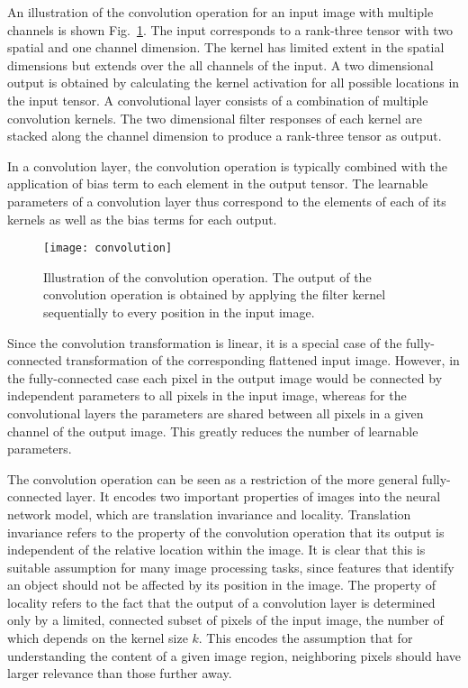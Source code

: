 An illustration of the convolution operation for an input image with multiple
channels is shown Fig.~\ref{fig:machine_learning:convoluation}. The input
corresponds to a rank-three tensor with two spatial and one channel dimension.
The kernel has limited extent in the spatial dimensions but extends over the all
channels of the input. A two dimensional output is obtained by calculating the
kernel activation for all possible locations in the input tensor. A
convolutional layer consists of a combination of multiple convolution kernels.
The two dimensional filter responses of each kernel are stacked along the
channel dimension to produce a rank-three tensor as output.

In a convolution layer, the convolution operation is typically combined with
the application of bias term to each element in the output tensor. The learnable
parameters of a convolution layer thus correspond to the elements of each of its
kernels as well as the bias terms for each output.

\begin{figure}
  \centering
  \texttt{[image: convolution]}
  \caption{
    Illustration of the convolution operation. The output of the convolution
    operation is obtained by applying the filter kernel sequentially to every
    position in the input image.
  }
  \label{fig:machine_learning:convoluation}
\end{figure}

Since the convolution transformation is linear, it is a special case of the
fully-connected transformation of the corresponding flattened input image.
However, in the fully-connected case each pixel in the output image would be
connected by independent parameters to all pixels in the input image, whereas
for the convolutional layers the parameters are shared between all pixels in a
given channel of the output image. This greatly reduces the number of learnable
parameters.

The convolution operation can be seen as a restriction of the more general
fully-connected layer. It encodes two important properties of images into the
neural network model, which are translation invariance and locality. Translation
invariance refers to the property of the convolution operation that its output
is independent of the relative location within the image. It is clear that this
is suitable assumption for many image processing tasks, since features that
identify an object should not be affected by its position in the image. The
property of locality refers to the fact that the output of a convolution layer
is determined only by a limited, connected subset of pixels of the input image,
the number of which depends on the kernel size $k$. This encodes the assumption
that for understanding the content of a given image region, neighboring pixels
should have larger relevance than those further away.

